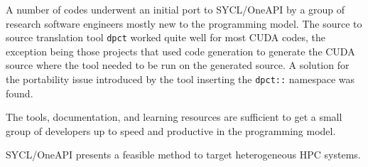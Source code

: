 
A number of codes underwent an initial port to SYCL/OneAPI by a group of research software engineers mostly new to the programming model. The source to source translation tool \texttt{dpct} worked quite well for most CUDA codes, the exception being those projects that used code generation to generate the CUDA source where the tool needed to be run on the generated source. A solution for the portability issue introduced by the tool inserting the \texttt{dpct::} namespace was found.

The tools, documentation, and learning resources are sufficient to get a small group of developers up to speed and productive in the programming model.

SYCL/OneAPI presents a feasible method to target heterogeneous HPC systems.
